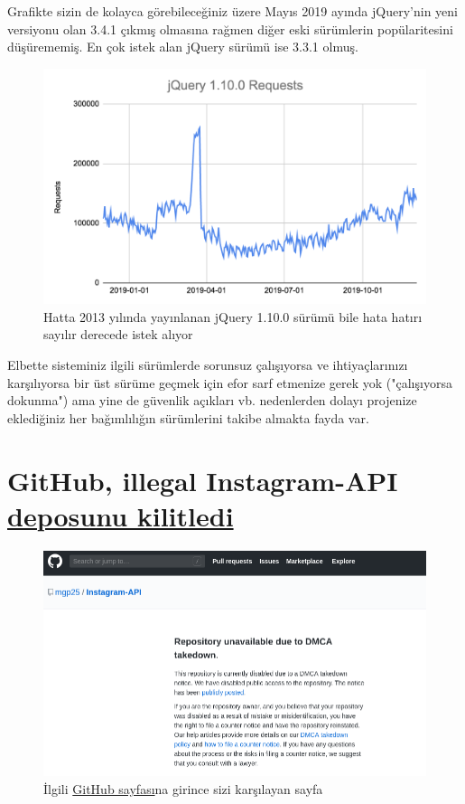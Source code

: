 \documentclass[11pt]{article}
\begin{document}
Grafikte sizin de kolayca görebileceğiniz üzere Mayıs 2019 ayında jQuery'nin
yeni versiyonu olan 3.4.1 çıkmış olmasına rağmen diğer eski sürümlerin
popülaritesini düşürememiş. En çok istek alan jQuery sürümü ise 3.3.1 olmuş.

\begin{figure}[htbp]
\centering
\includegraphics[width=.9\linewidth]{gorseller/cloudflare-jquery-2.png}
\caption{Hatta 2013 yılında yayınlanan jQuery 1.10.0 sürümü bile hata hatırı sayılır derecede istek alıyor}
\end{figure}

Elbette sisteminiz ilgili sürümlerde sorunsuz çalışıyorsa ve ihtiyaçlarınızı
karşılıyorsa bir üst sürüme geçmek için efor sarf etmenize gerek yok
("çalışıyorsa dokunma") ama yine de güvenlik açıkları vb. nedenlerden dolayı
projenize eklediğiniz her bağımlılığın sürümlerini takibe almakta fayda var.
\section{GitHub, illegal Instagram-API \href{https://github.com/github/dmca/blob/master/2020/01/2020-01-22-facebook.md}{deposunu kilitledi}}
\label{sec:org8518c2a}
\begin{figure}[htbp]
\centering
\includegraphics[width=.9\linewidth]{gorseller/github-instagram-api.png}
\caption{İlgili \href{https://github.com/mgp25/Instagram-API}{GitHub sayfası}na girince sizi karşılayan sayfa}
\end{figure}
\end{document}
